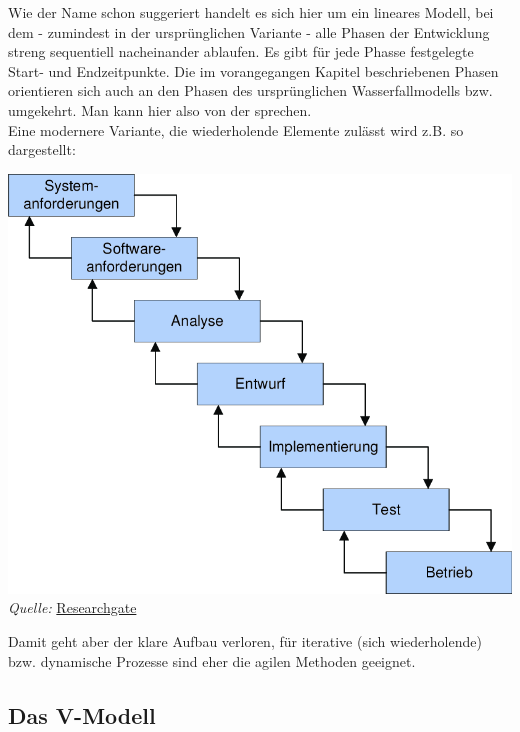 \documentclass{article}
\begin{document}
Wie der Name schon suggeriert handelt es sich hier um ein lineares Modell, bei dem - zumindest in der ursprünglichen Variante - alle Phasen der Entwicklung streng sequentiell nacheinander ablaufen. Es gibt für jede Phasse festgelegte Start- und Endzeitpunkte. Die im vorangegangen Kapitel beschriebenen Phasen orientieren sich auch an den Phasen des ursprünglichen Wasserfallmodells bzw. umgekehrt. Man kann hier also von der  sprechen. \\
Eine modernere Variante, die wiederholende Elemente zulässt wird z.B. so dargestellt: 
\begin{center}
    \includegraphics[scale=0.35]{../../media/wasserfallmodell.png} \\
    \textit{Quelle:} \href{https://www.researchgate.net/figure/Abbildung-21-Das-Wasserfallmodell_fig1_228914046}{Researchgate}
\end{center}
Damit geht aber der klare Aufbau verloren, für iterative (sich wiederholende) bzw. dynamische Prozesse sind eher die agilen Methoden geeignet.

\subsection{Das V-Modell}
\end{document}
